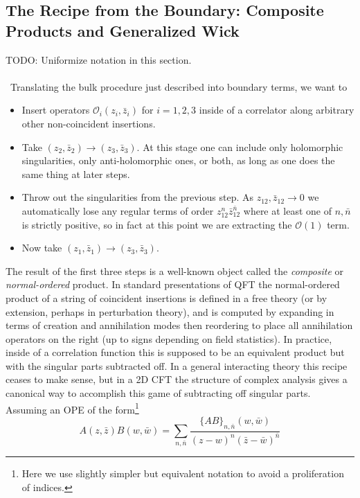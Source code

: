 \documentclass[11pt,letterpaper]{article}
\newcommand{\mc}[1]{\mathcal{#1}}
\begin{document}
\subsection{The Recipe from the Boundary: Composite Products and Generalized Wick}
TODO: Uniformize notation in this section.\\
\\
\
Translating the bulk procedure just described into boundary terms, we want to \begin{itemize}
    \item Insert operators $\mc{O}_i(z_i, \bar{z}_i)$ for $i=1,2,3$ inside of a correlator along arbitrary other non-coincident insertions.
    \item Take $(z_2, \bar{z}_2) \to (z_3, \bar{z}_3)$. At this stage one can include only holomorphic singularities, only anti-holomorphic ones, or both, as long as one does the same thing at later steps.
    \item Throw out the singularities from the previous step. As $z_{12}, \bar{z}_{12} \to 0$ we automatically lose any regular terms of order $z_{12}^n \bar{z}_{12}^{\bar{n}}$ where at least one of $n, \bar{n}$ is strictly positive, so in fact at this point we are extracting the $\mc{O}(1)$ term.
    \item Now take $(z_1, \bar{z}_1) \to (z_3, \bar{z}_3)$.
\end{itemize}
The result of the first three steps is a well-known object called the \textit{composite} or \textit{normal-ordered} product. In standard presentations of QFT the normal-ordered product of a string of coincident insertions is defined in a free theory (or by extension, perhaps in perturbation theory), and is computed by expanding in terms of creation and annihilation modes then reordering to place all annihilation operators on the right (up to signs depending on field statistics). In practice, inside of a correlation function this is supposed to be an equivalent product but with the singular parts subtracted off. In a general interacting theory this recipe ceases to make sense, but in a 2D CFT the structure of complex analysis gives a canonical way to accomplish this game of subtracting off singular parts. Assuming an OPE of the form\footnote{Here we use slightly simpler but equivalent notation to avoid a proliferation of indices.} \begin{equation}
A(z, \bar{z}) B (w, \bar{w}) = \sum_{n, \bar{n}} \frac{\{ AB \}_{n, \bar{n}}(w, \bar{w})}{(z - w)^n (\bar{z} - \bar{w})^{\bar{n}}}
\end{equation}
\end{document}
